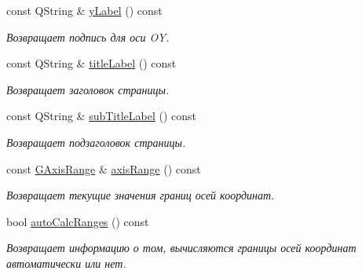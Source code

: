 \begin{DoxyCompactItemize}
\hypertarget{class_graph_sheet_aaa6ab077b521dbf9e1d7f9fd67f239ac}{}\label{class_graph_sheet_aaa6ab077b521dbf9e1d7f9fd67f239ac} 
const Q\+String \& \hyperlink{class_graph_sheet_aaa6ab077b521dbf9e1d7f9fd67f239ac}{y\+Label} () const
\begin{DoxyCompactList}\small\item\em Возвращает подпись для оси OY. \end{DoxyCompactList}\item 
\hypertarget{class_graph_sheet_a9fcfbe64aa23e4886085e1d000b76728}{}\label{class_graph_sheet_a9fcfbe64aa23e4886085e1d000b76728} 
const Q\+String \& \hyperlink{class_graph_sheet_a9fcfbe64aa23e4886085e1d000b76728}{title\+Label} () const
\begin{DoxyCompactList}\small\item\em Возвращает заголовок страницы. \end{DoxyCompactList}\item 
\hypertarget{class_graph_sheet_a6adc16508129da20d14cea23b289d99c}{}\label{class_graph_sheet_a6adc16508129da20d14cea23b289d99c} 
const Q\+String \& \hyperlink{class_graph_sheet_a6adc16508129da20d14cea23b289d99c}{sub\+Title\+Label} () const
\begin{DoxyCompactList}\small\item\em Возвращает подзаголовок страницы. \end{DoxyCompactList}\item 
\hypertarget{class_graph_sheet_ac13787fb3357ea7d4f3ee3aa4351b0d7}{}\label{class_graph_sheet_ac13787fb3357ea7d4f3ee3aa4351b0d7} 
const \hyperlink{struct_g_axis_range}{G\+Axis\+Range} \& \hyperlink{class_graph_sheet_ac13787fb3357ea7d4f3ee3aa4351b0d7}{axis\+Range} () const
\begin{DoxyCompactList}\small\item\em Возвращает текущие значения границ осей координат. \end{DoxyCompactList}\item 
\hypertarget{class_graph_sheet_a9f2c2ea18ef1ae736366de52cae6909a}{}\label{class_graph_sheet_a9f2c2ea18ef1ae736366de52cae6909a} 
bool \hyperlink{class_graph_sheet_a9f2c2ea18ef1ae736366de52cae6909a}{auto\+Calc\+Ranges} () const
\begin{DoxyCompactList}\small\item\em Возвращает информацию о том, вычисляются границы осей координат автоматически или нет. \end{DoxyCompactList}\item 
\hypertarget{class_graph_sheet_a31e3bbc91be8169bf5014601cea0cf54}{}\label{class_graph_sheet_a31e3bbc91be8169bf5014601cea0cf54} 

\end{DoxyCompactItemize}
